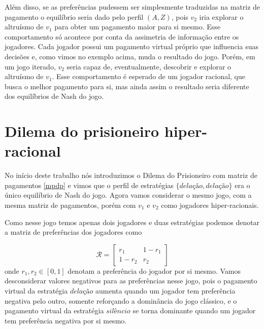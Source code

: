 Além disso, se as preferências pudessem ser simplesmente traduzidas na matriz de pagamento o equilíbrio seria dado pelo perfil $(A,Z)$, pois $v_2$ iria explorar o altruísmo de $v_1$ para obter um pagamento maior para si mesmo. Esse comportamento só acontece por conta da assimetria de informação entre os jogadores. Cada jogador possui um pagamento virtual próprio que influencia suas decisões e, como vimos no exemplo acima, muda o resultado do jogo. Porém, em um jogo iterado, $v_2$ seria capaz de, eventualmente, descobrir e explorar o altruísmo de $v_1$. Esse comportamento é esperado de um jogador racional, que busca o melhor pagamento para si, mas ainda assim o resultado seria diferente dos equilíbrios de Nash do jogo.


\section{Dilema do prisioneiro hiper-racional}

No início deste trabalho nós introduzimos o Dilema do Prisioneiro com matriz de pagamentos \ref{mpdp} e vimos que o perfil de estratégias $\{\textit{delação},\textit{delação}\}$ era o único equilíbrio de Nash do jogo. Agora vamos considerar o mesmo jogo, com a mesma matriz de pagamentos, porém com $v_1$ e $v_2$ como jogadores hiper-racionais.

Como nesse jogo temos apenas dois jogadores e duas estratégias podemos denotar a matriz de preferências dos jogadores como

\begin{equation}
    \label{matrizPrefPD}
    \mathcal{R}=
    \begin{bmatrix}
        r_1 & 1-r_1\\ 
        1-r_2 & r_2 
    \end{bmatrix}
\end{equation}
onde $r_1,r_2\in[0,1]$ denotam a preferência do jogador por si mesmo. Vamos desconsiderar valores negativos para as preferências nesse jogo, pois o pagamento virtual da estratégia $\textit{delação}$ aumenta quando um jogador tem preferência negativa pelo outro, somente reforçando a dominância do jogo clássico, e o pagamento virtual da estratégia $\textit{silêncio}$ se torna dominante quando um jogador tem preferência negativa por si mesmo. 

